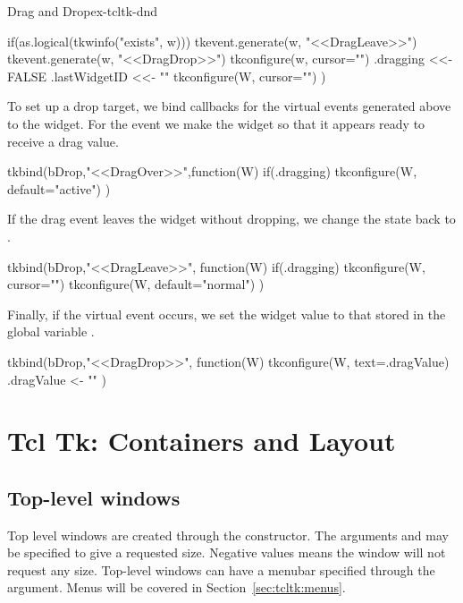 \begin{example}{Drag and Drop}{ex-tcltk-dnd}
\begin{Schunk}
\begin{Sinput}
{   if(as.logical(tkwinfo("exists", w))) {
     tkevent.generate(w, "<<DragLeave>>")
     tkevent.generate(w, "<<DragDrop>>")
     tkconfigure(w, cursor="")
   }
   .dragging <<- FALSE
   .lastWidgetID <<- "" 
   tkconfigure(W, cursor="")
 })
\end{Sinput}
\end{Schunk}
%
%
To set up a drop target, we bind callbacks for the virtual events
generated above to the widget. For the  event
we make the widget  so that it appears ready to receive a
drag value.
\begin{Schunk}
\begin{Sinput}
 tkbind(bDrop,"<<DragOver>>",function(W) {
   if(.dragging) 
     tkconfigure(W, default="active")
 })
\end{Sinput}
\end{Schunk}
%
If the drag event leaves the widget without dropping, we change the state back to .
\begin{Schunk}
\begin{Sinput}
 tkbind(bDrop,"<<DragLeave>>", function(W) {
   if(.dragging)  {
     tkconfigure(W, cursor="")
     tkconfigure(W, default="normal")  
    }
 })
\end{Sinput}
\end{Schunk}
%
Finally, if the  virtual event occurs, we set
the widget value to that stored in the global variable
.
\begin{Schunk}
\begin{Sinput}
 tkbind(bDrop,"<<DragDrop>>", function(W) {
   tkconfigure(W, text=.dragValue)
   .dragValue <- ""
 })
\end{Sinput}
\end{Schunk}
\end{example}





\chapter{Tcl Tk: Containers and Layout}
\label{sec:tcltk:basic-containers}

\section{Top-level windows}
\label{sec:tcltk:top-level-windows}

Top level windows are created through the 
constructor. The arguments  and  may be
specified to give a requested size. Negative values means the window
will not request any size. Top-level windows can have a menubar specified through the  argument. Menus will be covered
in Section~\ref{sec:tcltk:menus}.

